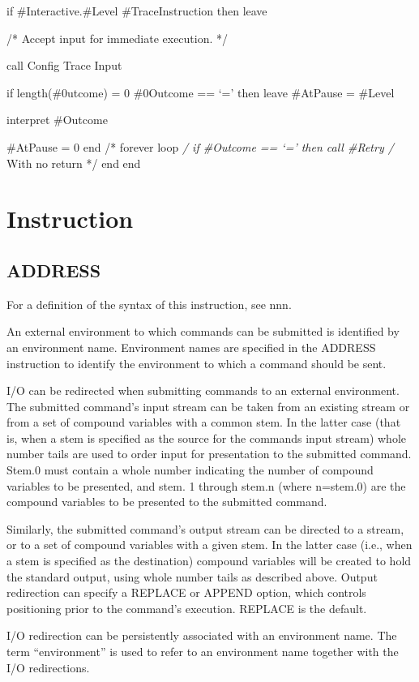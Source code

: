 if \#Interactive.\#Level \textbar{} \#TraceInstruction then leave

/* Accept input for immediate execution. */

call Config Trace Input

if length(\#0utcome) = 0 \textbar{} \#0Outcome == `=' then leave
\#AtPause = \#Level

interpret \#Outcome

\#AtPause = 0 end /* forever loop \emph{/ if \#Outcome == `=' then call
\#Retry /} With no return */ end end

\section{Instruction}\label{instruction}

\subsection{ADDRESS}\label{address}

For a definition of the syntax of this instruction, see nnn.

An external environment to which commands can be submitted is identified
by an environment name. Environment names are specified in the ADDRESS
instruction to identify the environment to which a command should be
sent.

I/O can be redirected when submitting commands to an external
environment. The submitted command's input stream can be taken from an
existing stream or from a set of compound variables with a common stem.
In the latter case (that is, when a stem is specified as the source for
the commands input stream) whole number tails are used to order input
for presentation to the submitted command. Stem.0 must contain a whole
number indicating the number of compound variables to be presented, and
stem. 1 through stem.n (where n=stem.0) are the compound variables to be
presented to the submitted command.

Similarly, the submitted command's output stream can be directed to a
stream, or to a set of compound variables with a given stem. In the
latter case (i.e., when a stem is specified as the destination) compound
variables will be created to hold the standard output, using whole
number tails as described above. Output redirection can specify a
REPLACE or APPEND option, which controls positioning prior to the
command's execution. REPLACE is the default.

I/O redirection can be persistently associated with an environment name.
The term ``environment'' is used to refer to an environment name
together with the I/O redirections.

